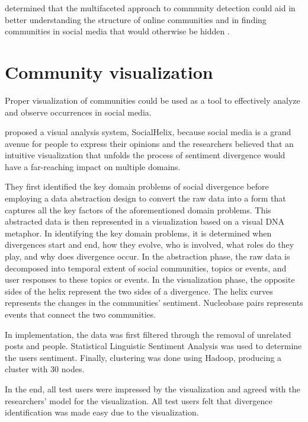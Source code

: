  determined that the multifaceted approach to community detection could aid in better understanding the structure of online communities and in finding communities in social media that would otherwise be hidden \cite{Darmon:2015}.


\section{Community visualization}


Proper visualization of communities could be used as a tool to effectively analyze and observe occurrences in social media.


 proposed a visual analysis system, SocialHelix, because social media is a grand avenue for people to express their opinions and the researchers believed that an intuitive visualization that unfolds the process of sentiment divergence would have a far-reaching impact on multiple domains. 


They first identified the key domain problems of social divergence before employing a data abstraction design to convert the raw data into a form that captures all the key factors of the aforementioned domain problems. This abstracted data is then represented in a visualization based on a visual DNA metaphor. In identifying the key domain problems, it is determined when divergences start and end, how they evolve, who is involved, what roles do they play, and why does divergence occur. In the abstraction phase, the raw data is decomposed into temporal extent of social communities, topics or events, and user responses to these topics or events. In the visualization phase, the opposite sides of the helix represent the two sides of a divergence. The helix curves represents the changes in the communities’ sentiment. Nucleobase pairs represents events that connect the two communities. 


In implementation, the data was first filtered through the removal of unrelated posts and people. Statistical Linguistic Sentiment Analysis was used to determine the user\vtick s sentiment. Finally, clustering was done using Hadoop, producing a cluster with 30 nodes. 


In the end, all test users were impressed by the visualization and agreed with the researchers’ model for the visualization. All test users felt that divergence identification was made easy due to the visualization. 



